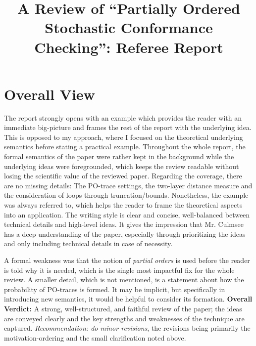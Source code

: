 \documentclass{llncs}
\begin{document}
\title{A Review of ``Partially Ordered Stochastic Conformance Checking'': Referee Report}


\maketitle


\section{Overall View}

The report strongly opens with an example which provides the reader with an immediate big-picture and frames the rest of the report with the underlying idea. This is opposed to my approach, where I focused on the theoretical underlying semantics before stating a practical example. Throughout the whole report, the formal semantics of the paper were rather kept in the background while the underlying ideas were foregrounded, which keeps the review readable without losing the scientific value of the reviewed paper. Regarding the coverage, there are no missing details: The PO-trace settings, the two-layer distance measure and the consideration of loops through truncation/bounds. Nonetheless, the example was always referred to, which helps the reader to frame the theoretical aspects into an application. The writing style is clear and concise, well-balanced between technical details and high-level ideas. It gives the impression that Mr. Culmsee has a deep understanding of the paper, especially through prioritizing the ideas and only including technical details in case of necessity.

A formal weakness was that the notion of \emph{partial orders} is used before the reader is told why it is needed, which is the single most impactful fix for the whole review. A smaller detail, which is not mentioned, is a statement about how the probability of PO-traces is formed. It may be implicit, but specifically in introducing new semantics, it would be helpful to consider its formation.
\textbf{ Overall Verdict:} A strong, well-structured, and faithful review of the paper; the ideas are conveyed clearly and the key strengths and weaknesses of the technique are captured. \emph{Recommendation: do minor revisions}, the revisions being primarily the motivation-ordering and the small clarification noted above.
\end{document}

